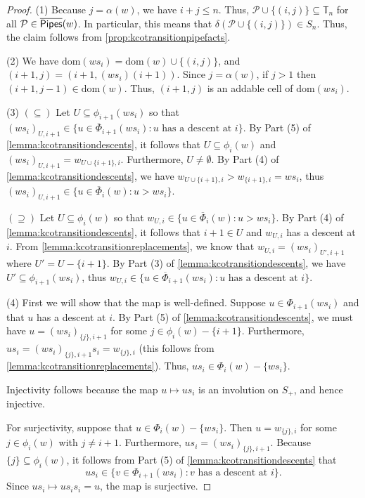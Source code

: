\documentclass[12 pt]{amsart}
\newcommand{\dom}{\mathrm{dom}}
\newcommand{\addable}{\alpha}
\numberwithin{equation}{section}
\theoremstyle{remark}
\newcommand{\kpipes}{\overline{\sf Pipes}}
\newcommand{\demprod}{\delta}
\newcommand{\cotransitionperms}{\Phi}
\newcommand{\cotransitionindices}{\phi}
\newcommand{\kcotransitionperms}{\overline{\Phi}}
\begin{document}
		\begin{proof}
			\noindent (1) Because $j=\addable(w)$, we have $i + j \leq n$.  Thus, $\mathcal{P} \cup \{(i,j)\} \subseteq \mathbb{T}_n$ for all $\mathcal{P} \in \kpipes(w)$. 
			In particular, this means that $\demprod(\mathcal{P}\cup\{(i,j)\})\in S_n$.
			Thus, the claim follows from \cref{prop:kcotransitionpipefacts}.
			
			
			\noindent (2) We have $\dom(ws_i) = \dom(w) \cup \{(i,j)\}$, and $(i + 1,j) = (i + 1,(ws_i)(i + 1))$. Since $j = \addable(w)$, if $j > 1$ then $(i + 1,j-1) \in \dom(w)$. Thus, $(i + 1,j)$ is an addable cell of $\dom(ws_i)$.
			
			\noindent (3) $(\subseteq)$ Let $U \subseteq \cotransitionindices_{i + 1}(ws_i)$ so that $(ws_i)_{U,i + 1} \in\{u \in \kcotransitionperms_{i + 1}(ws_i) : u \text{ has a descent at } i\}$. 
			By Part (5) of \cref{lemma:kcotransitiondescents}, it follows that $U \subseteq \cotransitionindices_i(w)$ and $(ws_i)_{U,i + 1}=w_{U \cup \{i + 1\},i}$. Furthermore, $U \neq \emptyset$.
			By Part (4) of \cref{lemma:kcotransitiondescents}, we have $w_{U \cup \{i + 1\},i} > w_{\{i + 1\},i}=ws_i$, thus $(ws_i)_{U,i + 1} \in \{u \in \kcotransitionperms_{i}(w): u > ws_i\}$.
			
			\noindent $(\supseteq)$ Let $U \subseteq \cotransitionindices_i(w)$ so that $w_{U,i} \in \{u \in \kcotransitionperms_{i}(w) : u > ws_i\}$. 
			By Part (4) of \cref{lemma:kcotransitiondescents}, it follows that $i + 1 \in U$ and $w_{U,i}$ has a descent at $i$. 
			From \cref{lemma:kcotransitionreplacements}, we know that $w_{U,i}=(ws_i)_{U',i + 1}$ where $U'=U-\{i + 1\}$. 
			By Part (3) of \cref{lemma:kcotransitiondescents}, we have $U' \subseteq \cotransitionindices_{i + 1}(ws_i)$, thus $w_{U,i} \in \{u \in \kcotransitionperms_{i + 1}(ws_i) : u \text{ has a descent at } i\}$.
			
			
			\noindent (4) First we will show that the map is well-defined. 
			Suppose $u \in \cotransitionperms_{i + 1}(ws_i)$ and that $u$ has a descent at $i$.
			By Part (5) of \cref{lemma:kcotransitiondescents}, we must have $u=(ws_i)_{\{j\},i + 1}$ for some $j \in \cotransitionindices_i(w)-\{i + 1\}$. Furthermore, $us_i=(ws_i)_{\{j\},i + 1}s_i=w_{\{j\},i}$ (this follows from \cref{lemma:kcotransitionreplacements}). Thus, $us_i \in \cotransitionperms_i(w)-\{ws_i\}$.
			
			Injectivity follows because the map $u \mapsto us_i$ is an involution on $S_{+} $, and hence injective.
			
			For surjectivity, suppose that $u \in \cotransitionperms_i(w)-\{ws_i\}$. 
			Then $u=w_{\{j\},i}$ for some $j \in \cotransitionindices_i(w)$ with $j \neq i + 1$. 
			Furthermore, $us_i=(ws_i)_{\{j\},i + 1}$.
			Because $\{j\} \subseteq \cotransitionindices_i(w)$, it follows from Part (5) of \cref{lemma:kcotransitiondescents} that 
			\[us_i \in \{v \in \cotransitionperms_{i + 1}(ws_i) : v \text{ has a descent at } i\}.\] 
			Since $us_i \mapsto us_is_i=u$, the map is surjective.
		\end{proof}
	
\end{document}
